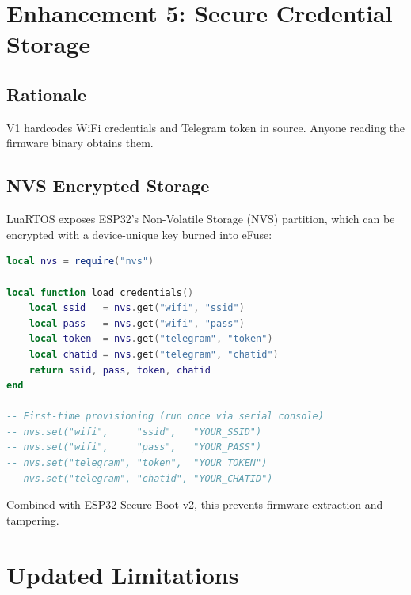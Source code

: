 \documentclass[11pt,a4paper]{article}
\begin{document}
\section{Enhancement 5: Secure Credential Storage}

\subsection{Rationale}
V1 hardcodes WiFi credentials and Telegram token in source. Anyone reading the firmware binary obtains them.

\subsection{NVS Encrypted Storage}
LuaRTOS exposes ESP32's Non-Volatile Storage (NVS) partition, which can be encrypted with a device-unique key burned into eFuse:

\begin{lstlisting}[language=Lua, caption={NVS credential read at boot}]
local nvs = require("nvs")

local function load_credentials()
    local ssid   = nvs.get("wifi", "ssid")
    local pass   = nvs.get("wifi", "pass")
    local token  = nvs.get("telegram", "token")
    local chatid = nvs.get("telegram", "chatid")
    return ssid, pass, token, chatid
end

-- First-time provisioning (run once via serial console)
-- nvs.set("wifi",     "ssid",   "YOUR_SSID")
-- nvs.set("wifi",     "pass",   "YOUR_PASS")
-- nvs.set("telegram", "token",  "YOUR_TOKEN")
-- nvs.set("telegram", "chatid", "YOUR_CHATID")
\end{lstlisting}

Combined with ESP32 Secure Boot v2, this prevents firmware extraction and tampering.

\section{Updated Limitations}
\end{document}
